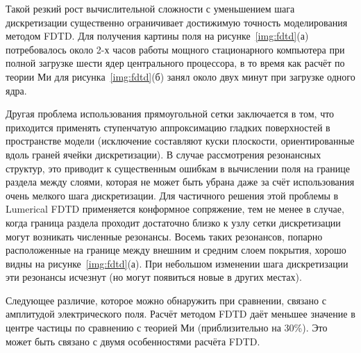 Такой резкий рост вычислительной сложности с уменьшением шага
дискретизации существенно ограничивает достижимую точность
моделирования методом FDTD. Для получения картины поля на
рисунке~\ref{img:fdtd}(а) потребовалось около 2-х часов работы мощного
стационарного компьютера при полной загрузке шести ядер центрального
процессора, в то время как расчёт по теории Ми для
рисунка~\ref{img:fdtd}(б) занял около двух минут при загрузке одного
ядра.

Другая проблема использования прямоугольной сетки заключается в том,
что приходится применять ступенчатую аппроксимацию гладких
поверхностей в пространстве модели (исключение составляют куски
плоскости, ориентированные вдоль граней ячейки дискретизации). В
случае рассмотрения резонансных структур, это приводит к существенным
ошибкам в вычислении поля на границе раздела между слоями, которая не
может быть убрана даже за счёт использования очень мелкого шага
дискретизации.  Для частичного решения этой проблемы в Lumerical FDTD
применяется конформное сопряжение, тем не менее в случае, когда
граница раздела проходит достаточно близко к узлу сетки дискретизации
могут возникать численные резонансы. Восемь таких резонансов, попарно
расположенные на границе между внешним и средним слоем покрытия,
хорошо видны на рисунке~\ref{img:fdtd}(а). При небольшом изменении
шага дискретизации эти резонансы исчезнут (но могут появиться новые в
других местах).

Следующее различие, которое можно обнаружить при сравнении, связано с
амплитудой электрического поля.  Расчёт методом FDTD даёт меньшее
значение в центре частицы по сравнению с теорией Ми (приблизительно на
30\%).  Это может быть связано с двумя особенностями расчёта FDTD.

